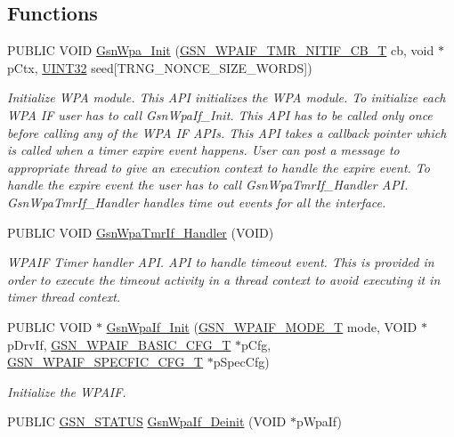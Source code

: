 \subsection*{Functions}
\begin{DoxyCompactItemize}
\item 
PUBLIC VOID \hyperlink{a00687_ga49429fc4b151d4d9d2da3fab4f0d1ac1}{GsnWpa\_\-Init} (\hyperlink{a00687_ga84bfdf616b263689a81c060d1bdf224b}{GSN\_\-WPAIF\_\-TMR\_\-NITIF\_\-CB\_\-T} cb, void $\ast$pCtx, \hyperlink{a00660_gae1e6edbbc26d6fbc71a90190d0266018}{UINT32} seed\mbox{[}TRNG\_\-NONCE\_\-SIZE\_\-WORDS\mbox{]})
\begin{DoxyCompactList}\small\item\em Initialize WPA module. This API initializes the WPA module. To initialize each WPA IF user has to call GsnWpaIf\_\-Init. This API has to be called only once before calling any of the WPA IF APIs. This API takes a callback pointer which is called when a timer expire event happens. User can post a message to appropriate thread to give an execution context to handle the expire event. To handle the expire event the user has to call GsnWpaTmrIf\_\-Handler API. GsnWpaTmrIf\_\-Handler handles time out events for all the interface. \end{DoxyCompactList}\item 
PUBLIC VOID \hyperlink{a00687_ga217dd44d571805052c1977dc467daa42}{GsnWpaTmrIf\_\-Handler} (VOID)
\begin{DoxyCompactList}\small\item\em WPAIF Timer handler API. API to handle timeout event. This is provided in order to execute the timeout activity in a thread context to avoid executing it in timer thread context. \end{DoxyCompactList}\item 
PUBLIC VOID $\ast$ \hyperlink{a00687_ga0f9e51e12292ff32189550c167593fd7}{GsnWpaIf\_\-Init} (\hyperlink{a00687_gafdd00105be3584713f485995fb16fc07}{GSN\_\-WPAIF\_\-MODE\_\-T} mode, VOID $\ast$pDrvIf, \hyperlink{a00420}{GSN\_\-WPAIF\_\-BASIC\_\-CFG\_\-T} $\ast$pCfg, \hyperlink{a00426}{GSN\_\-WPAIF\_\-SPECFIC\_\-CFG\_\-T} $\ast$pSpecCfg)
\begin{DoxyCompactList}\small\item\em Initialize the WPAIF. \end{DoxyCompactList}\item 
PUBLIC \hyperlink{a00660_gada5951904ac6110b1fa95e51a9ddc217}{GSN\_\-STATUS} \hyperlink{a00687_ga5c5fa045eb04e3e56b671b73f35c10b1}{GsnWpaIf\_\-Deinit} (VOID $\ast$pWpaIf)

\end{DoxyCompactItemize}
